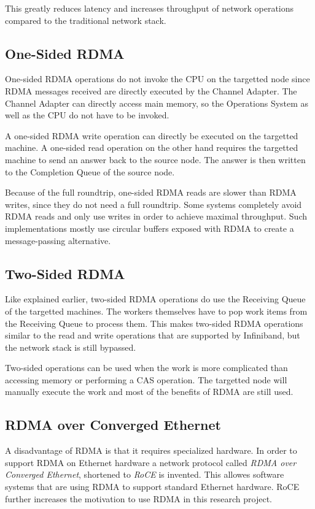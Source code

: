 This greatly reduces latency and increases throughput of network operations compared to the traditional network stack. 

\subsection{One-Sided RDMA}
One-sided RDMA operations do not invoke the CPU on the targetted node since RDMA messages received are directly executed by the Channel Adapter. The Channel Adapter can directly access main memory, so the Operations System as well as the CPU do not have to be invoked. 

A one-sided RDMA write operation can directly be executed on the targetted machine. A one-sided read operation on the other hand requires the targetted machine to send an answer back to the source node. The answer is then written to the Completion Queue of the source node. 

Because of the full roundtrip, one-sided RDMA reads are slower than RDMA writes, since they do not need a full roundtrip. Some systems completely avoid RDMA reads and only use writes in order to achieve maximal throughput. Such implementations mostly use circular buffers exposed with RDMA to create a message-passing alternative.

\subsection{Two-Sided RDMA}
Like explained earlier, two-sided RDMA operations do use the Receiving Queue of the targetted machines. The workers themselves have to pop work items from the Receiving Queue to process them. This makes two-sided RDMA operations similar to the read and write operations that are supported by Infiniband, but the network stack is still bypassed.

Two-sided operations can be used when the work is more complicated than accessing memory or performing a CAS operation. The targetted node will manually execute the work and most of the benefits of RDMA are still used.

\subsection{RDMA over Converged Ethernet}
A disadvantage of RDMA is that it requires specialized hardware. In order to support RDMA on Ethernet hardware a network protocol called \emph{RDMA over Converged Ethernet}, shortened to \emph{RoCE} is invented. This allowes software systems that are using RDMA to support standard Ethernet hardware. RoCE further increases the motivation to use RDMA in this research project.


